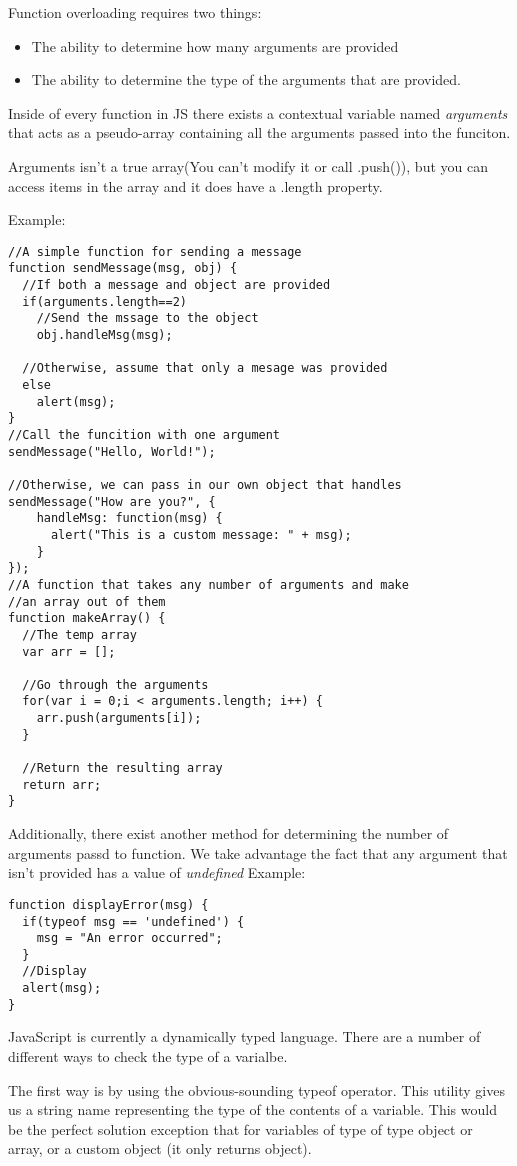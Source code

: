 \documentclass[a4paper,11pt]{book}
\begin{document}
Function overloading requires two things: 
\begin{itemize}
\item The ability to determine how many arguments are provided
\item The ability to determine the type of the arguments that are provided.
\end{itemize}

Inside of every function in JS there exists a contextual variable named
\emph{arguments} that acts as a pseudo-array containing all the arguments passed
into the funciton. 

Arguments isn't a true array(You can't modify it or call .push()), but you can
access items in the array and it does have a .length property.

Example:
\begin{verbatim}
//A simple function for sending a message
function sendMessage(msg, obj) {
  //If both a message and object are provided
  if(arguments.length==2) 
    //Send the mssage to the object
    obj.handleMsg(msg);

  //Otherwise, assume that only a mesage was provided
  else
    alert(msg);
}
//Call the funcition with one argument
sendMessage("Hello, World!");

//Otherwise, we can pass in our own object that handles
sendMessage("How are you?", {
    handleMsg: function(msg) {
      alert("This is a custom message: " + msg);
    }
});
//A function that takes any number of arguments and make
//an array out of them
function makeArray() {
  //The temp array
  var arr = [];

  //Go through the arguments
  for(var i = 0;i < arguments.length; i++) {
    arr.push(arguments[i]);
  }

  //Return the resulting array
  return arr;
}
\end{verbatim}
Additionally, there exist another method for determining the number of arguments
passd to function. We take advantage the fact that any argument that isn't
provided has a value of \emph{undefined}
Example:
\begin{verbatim}
function displayError(msg) {
  if(typeof msg == 'undefined') {
    msg = "An error occurred";
  }
  //Display
  alert(msg);
}
\end{verbatim}

JavaScript is currently a dynamically typed language. There are a number of
different ways to check the type of a varialbe.

The first way is by using the obvious-sounding typeof operator. This utility
gives us a string name representing the type of the contents of a variable. This
would be the perfect solution exception that for variables of type of type
object or array, or a custom object (it only returns object).
\end{document}
